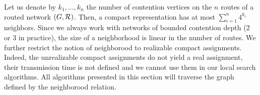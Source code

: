 \documentclass[english]{article}
\begin{document}
% 
% 
% 
% 
% 

 Let us denote by $k_1,\ldots,k_n$ the number of contention vertices on the $n$ routes of 
 a routed network $(G,\cal{R})$. Then, a compact representation has at most $\sum_{i=1}^n 4^{k_i}$ neighbors. Since we always work with networks of bounded contention depth ($2$ or $3$ in practice), the size of a neighborhood is linear in the number of routes.
 We further restrict the notion of neighborood to realizable compact assignments. Indeed, the unrealizable compact assignments do not yield a real assignment, their transmission time is not defined and we cannot use them in our local search algorithms. All algorithms presented in this section will traverse the graph defined by the neighborood relation. 

\end{document}
